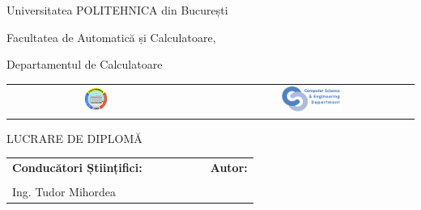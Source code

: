 \begin{titlepage}
	\begin{center}
		{\Large Universitatea POLITEHNICA din București}
		\par\vspace*{2mm}
		{\Large Facultatea de Automatică și Calculatoare,
		
		 Departamentul de Calculatoare}
		\par\vspace*{3mm}
		\begin{table}[h]
        	\begin{center}
				\begin{tabular}{cccc}
                    \includegraphics[width=0.13\textwidth]{src/img/branding/upb}
					& & &
					\includegraphics[width=0.30\textwidth]{src/img/branding/cs}
            	\end{tabular}
			\end{center}
		\end{table}
		
		\par\vspace*{35mm}
		{\Huge LUCRARE DE DIPLOMĂ}
		\par\vspace*{15mm}
		{\Huge \VARtitlero}
		\par\vspace*{35mm}
		\begin{table}[h]
        	\begin{center}
				\begin{tabular}{lcccccl}
					\Large \textbf{\Large Conducători Științifici:}
					\vspace*{1mm} &&&&&& \Large \textbf{\Large Autor:}\vspace*{1mm} \\
					\Large \VARadviser &&&&&& \Large \VARauthor \\
                                        \Large Ing. Tudor Mihordea
				\end{tabular}
			\end{center}
		\end{table}

		\par\vspace*{40mm}
		\Large \VARtitlefooterro
	\end{center}
\end{titlepage}
